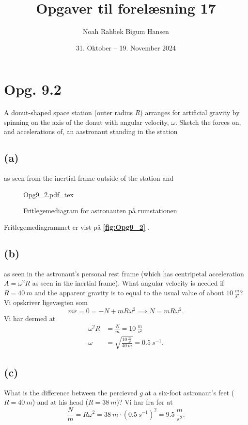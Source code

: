 \documentclass[12pt]{article}
\title{Opgaver til forelæsning 17}
\author{Noah Rahbek Bigum Hansen}
\date{31. Oktober -- 19. November 2024}
\newcommand{\incfig}[2][1]{%
  \def\svgwidth{#1\columnwidth}
  {#2.pdf_tex}
}
\theoremstyle{definition}
\begin{document}
\maketitle

\section*{Opg. 9.2}
A donut-shaped space station (outer radius $R$) arranges for artificial gravity by spinning on the axis of the donut with angular velocity, $\omega$. Sketch the forces on, and accelerations of, an aastronaut standing in the station

\subsection*{(a)}
as seen from the inertial frame outside of the station and
\bigbreak
\begin{figure}[ht]
  \centering
  \incfig[0.4]{Opg9_2}
  \caption{Fritlegemediagram for astronauten på rumstationen}
  \label{fig:Opg9_2}
\end{figure}
Fritlegemediagrammet er vist på \textbf{\autoref{fig:Opg9_2}} .

\subsection*{(b)}
as seen in the astronaut's personal rest frame (which has centripetal acceleration $A = \omega^2R$ as seen in the inertial frame). What angular velocity is needed if $R = \qty{40}{m}$ and the apparent gravity is to equal to the usual value of about $\qty{10}{\frac{m}{s^2}}$?
\bigbreak
Vi opskriver ligevægten som
\[ 
m \ddot{r} = 0 = -N + mR\omega^2 \implies N = mR\omega^2
.\]
Vi har dermed at
\begin{align*}
  \omega^2 R &= \frac{N}{m} = \qty{10}{\frac{m}{s^2}} \\
  \omega &= \sqrt{\frac{\qty{10}{\frac{m}{s^2}}}{\qty{40}{m}}} = \qty{0,5}{s^{-1}} 
.\end{align*}


\subsection*{(c)}
What is the difference between the percieved $g$ at a six-foot astronaut's feet ($R = \qty{40}{m}$) and at his head ($R = \qty{38}{m}$)?
\bigbreak
Vi har fra før at
\[ 
\frac{N}{m} = R\omega^2 = \qty{38}{m} \cdot \left( \qty{0,5}{s^{-1}}  \right)^2 = \qty{9,5}{\frac{m}{s^2}} 
.\]
\end{document}

